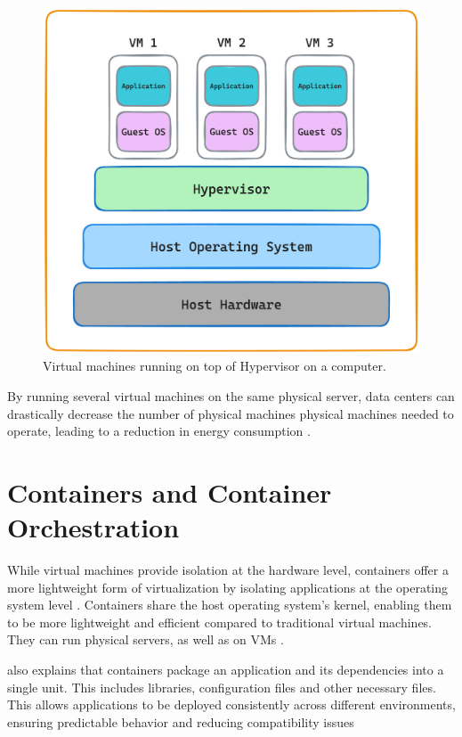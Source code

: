 \documentclass[
  table]{report}
\begin{document}
\begin{figure}[H]
\centering
  \includegraphics[width=0.7\columnwidth]{assets/3.2-vm-figure.png}
  \caption{Virtual machines running on top of Hypervisor on a computer.}
  \label{vm-figure}
\end{figure}

By running several virtual machines on the same physical server, data
centers can drastically decrease the number of physical machines
physical machines needed to operate, leading to a reduction in energy
consumption \citep{kaplanRevolutionizingDataCenter2008}.

\section{Containers and Container Orchestration}
\label{sect:containers}

While virtual machines provide isolation at the hardware level,
containers offer a more lightweight form of virtualization by isolating
applications at the operating system level
\citep{merkelDockerLightweightLinux2014}. Containers share the host
operating system's kernel, enabling them to be more lightweight and
efficient compared to traditional virtual machines. They can run
physical servers, as well as on \ac{VMs}
\citep{bernsteinContainersCloudLXC2014}.

\citet{merkelDockerLightweightLinux2014} also explains that containers
package an application and its dependencies into a single unit. This
includes libraries, configuration files and other necessary files. This
allows applications to be deployed consistently across different
environments, ensuring predictable behavior and reducing compatibility
issues \citep{sergeevDockerContainerPerformance2022}
\end{document}
